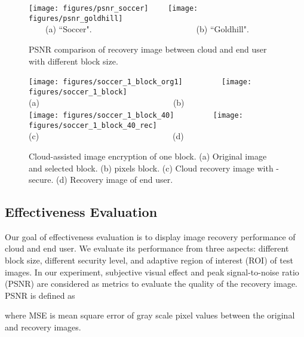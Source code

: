 \documentclass[conference]{IEEEtran}
\begin{document}
\begin{figure}[t]
\begin{center}
  \texttt{[image: figures/psnr\_soccer]}~~~~
  \texttt{[image: figures/psnr\_goldhill]}\\
  {\footnotesize ~~~~(a) ``Soccer".~~~~~~~~~~~~~~~~~~~~~~~~~(b) ``Goldhill".} \\
  \caption{{\footnotesize PSNR comparison of recovery image between cloud and end user with different block size. }}\label{f_psnr_diff_block_size}
 \end{center}
\end{figure}

\begin{figure}[t]
\begin{center}
  \texttt{[image: figures/soccer\_1\_block\_org1]} ~~~~~~~~
  \texttt{[image: figures/soccer\_1\_block]}\\
  {\footnotesize (a)~~~~~~~~~~~~~~~~~~~~~~~~~~~~~~~~(b)}\\
  \texttt{[image: figures/soccer\_1\_block\_40]} ~~~~~~~~
  \texttt{[image: figures/soccer\_1\_block\_40\_rec]}\\
  {\footnotesize (c)~~~~~~~~~~~~~~~~~~~~~~~~~~~~~~~~(d)} \\
  \caption{{\footnotesize Cloud-assisted image encryption of one block. (a) Original image and selected block. (b)  pixels block. (c) Cloud recovery image with -secure. (d) Recovery image of end user.}}\label{f_se_diff_1_block_size}
 \end{center}
\end{figure}

\subsection{Effectiveness Evaluation}
Our goal of effectiveness evaluation is to display image recovery performance of cloud and end user. We evaluate its performance from three aspects: different block size, different  security level, and adaptive region of interest (ROI) of test images. In our experiment, subjective visual effect and peak signal-to-noise ratio (PSNR) are considered as metrics to evaluate the quality of the recovery image. PSNR is defined as

where MSE is mean square error of gray scale pixel values between the original and recovery images.
\end{document}
